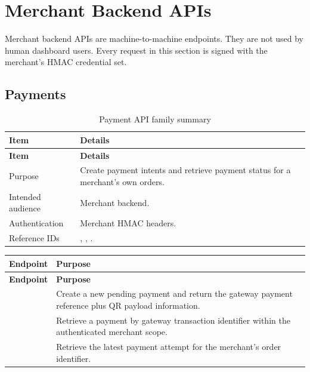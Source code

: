 \section{Merchant Backend APIs}

Merchant backend APIs are machine-to-machine endpoints. They are not used by
human dashboard users. Every request in this section is signed with the
merchant's HMAC credential set.

\subsection{Payments}

\begin{longtable}{@{}L{0.25\textwidth}L{0.65\textwidth}@{}}
\caption{Payment API family summary}\\
\toprule
\textbf{Item} & \textbf{Details} \\
\midrule
\endfirsthead
\toprule
\textbf{Item} & \textbf{Details} \\
\midrule
\endhead
Purpose & Create payment intents and retrieve payment status for a merchant's
own orders. \\
\bodyrowrule
Intended audience & Merchant backend. \\
\bodyrowrule
Authentication & Merchant HMAC headers. \\
\bodyrowrule
Reference IDs & , , . \\
\bottomrule
\end{longtable}

\begin{longtable}{@{}L{0.31\textwidth}L{0.59\textwidth}@{}}
\toprule
\textbf{Endpoint} & \textbf{Purpose} \\
\midrule
\endfirsthead
\toprule
\textbf{Endpoint} & \textbf{Purpose} \\
\midrule
\endhead
{} & Create a new pending payment and return the gateway
payment reference plus QR payload information. \\
\bodyrowrule
{} & Retrieve a payment by gateway
transaction identifier within the authenticated merchant scope. \\
\bodyrowrule
{} & Retrieve the latest payment
attempt for the merchant's order identifier. \\
\bottomrule
\end{longtable}

